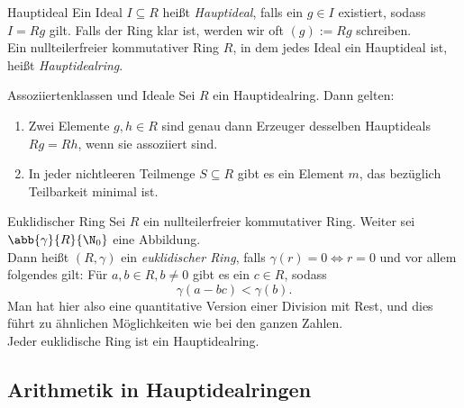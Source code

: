 \begin{karte}{Hauptideal}
    Ein Ideal \(I \subseteq R\) heißt \textit{Hauptideal}, falls ein 
    \(g\in I\) existiert, sodass \(I = Rg\) gilt. Falls der Ring klar ist, 
    werden wir oft \((g) := Rg\) schreiben. \\
    Ein nullteilerfreier kommutativer Ring \(R\), in dem jedes Ideal 
    ein Hauptideal ist, heißt \textit{Hauptidealring}.
\end{karte}

\begin{karte}{Assoziiertenklassen und Ideale}
    Sei \(R\) ein Hauptidealring. Dann gelten: 
    \begin{enumerate}
        \item Zwei Elemente \(g,h\in R\) sind genau dann Erzeuger desselben 
        Hauptideals \(Rg = Rh\), wenn sie assoziiert sind. 
        \item In jeder nichtleeren Teilmenge \(S\subseteq R\) gibt es ein 
        Element \(m\), das bezüglich Teilbarkeit minimal ist.
    \end{enumerate}
\end{karte}

\begin{karte}{Euklidischer Ring}
    Sei \(R\) ein nullteilerfreier kommutativer Ring. Weiter sei 
    \(\abb{\gamma}{R}{\N_0}\) eine Abbildung. \\
    Dann heißt \( (R,\gamma) \) ein \textit{euklidischer Ring}, 
    falls \( \gamma(r) = 0 \Leftrightarrow r = 0 \) 
    und vor allem folgendes gilt: Für \(a,b\in R, b\neq 0\) gibt 
    es ein \(c \in R\), sodass 
    \[ \gamma(a - bc) < \gamma(b). \]
    Man hat hier also eine quantitative Version einer Division 
    mit Rest, und dies führt zu ähnlichen Möglichkeiten wie bei 
    den ganzen Zahlen.\\
    Jeder euklidische Ring ist ein Hauptidealring.
\end{karte}

\subsection{Arithmetik in Hauptidealringen}

